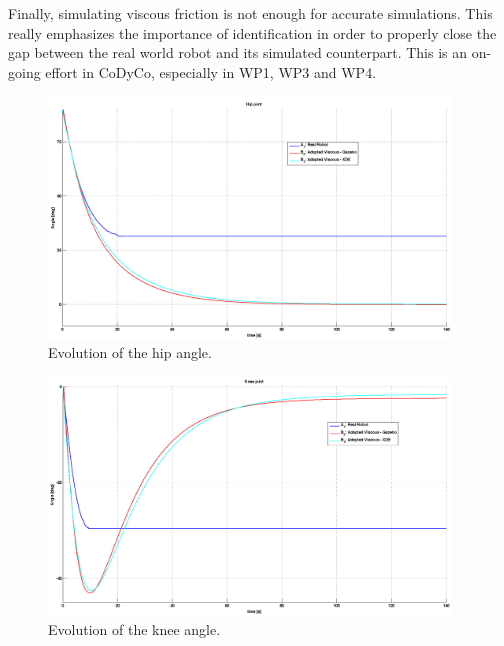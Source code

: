 \documentclass[12pt,a4paper,twoside]{article}
\begin{document}
Finally, simulating viscous friction is not enough for accurate simulations. This really emphasizes the importance of identification in order to properly close the gap between the real world robot and its simulated counterpart. This is an on-going effort in CoDyCo, especially in WP1, WP3 and WP4.\\

\begin{figure}[h]
\begin{center}
\includegraphics[width=0.95\textwidth]{hip_fig.png}
\caption{Evolution of the hip angle.}
\label{fig:hip}
\end{center}
\end{figure}

\begin{figure}[h]
\begin{center}
\includegraphics[width=0.95\textwidth]{knee_fig.png}
\caption{Evolution of the knee angle.}
\label{fig:knee}
\end{center}
\end{figure}
\end{document}
